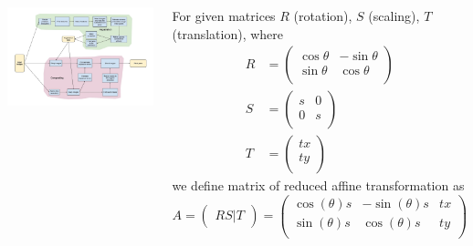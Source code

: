 \documentclass[17pt, a0paper, portrait]{tikzposter}
\begin{document}
\begin{columns}
{\begin{tikzfigure}
    \centering
    \includegraphics[width=\linewidth]{../img/StitchingPipeline.png}
    \label{fig:opencv}
\end{tikzfigure}


\begin{defn}
For given matrices $R$ (rotation), $S$ (scaling), $T$ (translation), where
\begin{align}
    R &=
    \begin{pmatrix}
        \cos{\theta} & -\sin{\theta} \\
        \sin{\theta} & \cos{\theta} \\
    \end{pmatrix} \\
    S &=
    \begin{pmatrix}
        s & 0 \\
        0 & s \\
    \end{pmatrix} \\
    T &=
    \begin{pmatrix}
        tx \\
        ty \\
    \end{pmatrix}
\end{align}
we define matrix of reduced affine transformation as
\begin{equation}
    A =
    \begin{pmatrix}
        RS|T
    \end{pmatrix}
    =
    \begin{pmatrix}
        \cos(\theta)s & -\sin(\theta)s & tx \\
        \sin(\theta)s & \cos(\theta)s & ty \\
    \end{pmatrix}
\end{equation}
\end{defn}

}
\end{columns}
\end{document}
